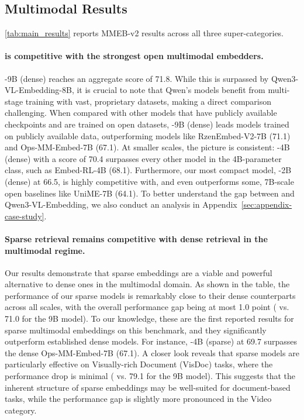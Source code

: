 \subsection{Multimodal Results}\label{sec:multimodal-results}



\autoref{tab:main_results} reports MMEB-v2 results across all three super-categories. 

\paragraph{\ours is competitive with the strongest open multimodal embedders.}
\ours-9B (dense) reaches an aggregate score of 71.8. While this is surpassed by Qwen3-VL-Embedding-8B, it is crucial to note that Qwen's models benefit from multi-stage training with vast, proprietary datasets, making a direct comparison challenging. When compared with other models that have publicly available checkpoints and are trained on open datasets, \ours-9B (dense) leads models trained on publicly available data, outperforming models like RzenEmbed-V2-7B (71.1) and Ops-MM-Embed-7B (67.1). At smaller scales, the picture is consistent: \ours-4B (dense) with a score of 70.4 surpasses every other model in the 4B-parameter class, such as Embed-RL-4B (68.1). Furthermore, our most compact model, \ours-2B (dense) at 66.5, is highly competitive with, and even outperforms some, 7B-scale open baselines like UniME-7B (64.1). To better understand the gap between \ours and Qwen3-VL-Embedding, we also conduct an analysis in Appendix~\ref{sec:appendix-case-study}. 

\paragraph{Sparse retrieval remains competitive with dense retrieval in the multimodal regime.}
Our results demonstrate that sparse embeddings are a viable and powerful alternative to dense ones in the multimodal domain. As shown in the table, the performance of our sparse models is remarkably close to their dense counterparts across all scales, with the overall performance gap being at most 1.0 point ( vs. 71.0 for the 9B model). To our knowledge, these are the first reported results for sparse multimodal embeddings on this benchmark, and they significantly outperform established dense models. For instance, \ours-4B (sparse) at 69.7 surpasses the dense Ops-MM-Embed-7B (67.1). A closer look reveals that sparse models are particularly effective on Visually-rich Document (VisDoc) tasks, where the performance drop is minimal ( vs. 79.1 for the 9B model). This suggests that the inherent structure of sparse embeddings may be well-suited for document-based tasks, while the performance gap is slightly more pronounced in the Video category. 

